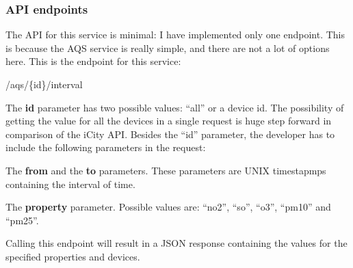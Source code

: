 \subsubsection*{API endpoints}

The API for this service is minimal: I have implemented only one endpoint. This
is because the AQS service is really simple, and there are not a lot of
options here. This is the endpoint for this service:

\begin{center}
  /aqs/\{id\}/interval
\end{center}

The {\bf id} parameter has two possible values: ``all'' or a device id. The
possibility of getting the value for all the devices in a single request is
huge step forward in comparison of the iCity API. Besides the ``id'' parameter,
the developer has to include the following parameters in the request:

\mylist
  \item The {\bf from} and the {\bf to} parameters. These parameters are UNIX
timestapmps containing the interval of time.
  \item The {\bf property} parameter. Possible values are: ``no2'', ``so'',
``o3'', ``pm10'' and ``pm25''.
\mylistend

Calling this endpoint will result in a JSON response containing the values for
the specified properties and devices.
